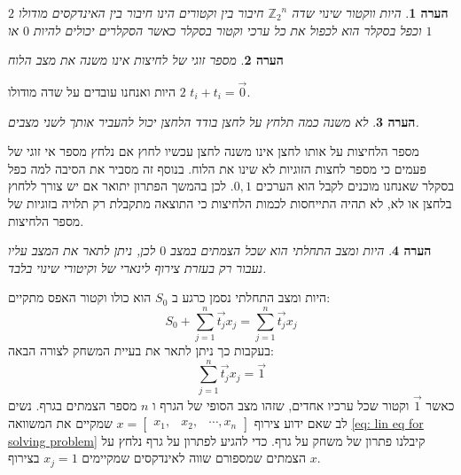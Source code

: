 \documentclass[12pt,leqno]{article}
\newtheorem{comm}{הערה}[section]
\newcommand{\sumi}[1]{\sum_{#1=1}^n}
\newcommand{\Zn}{{\mathbb{Z}_2}^n}
\begin{document}
\begin{comm}
    היות ווקטור שינוי שדה
    $\Zn$
    חיבור בין וקטורים הינו חיבור בין האינדקסים מודולו 
    $2$
    וכפל בסקלר
    הוא לכפול את כל ערכי וקטור בסקלר
    כאשר הסקלרים יכולים להיות
    $0$
    או 
    $1$
\end{comm}
\begin{comm}
    מספר זוגי של לחיצות אינו משנה את מצב הלוח
\end{comm}
היות 
ואנחנו עובדים על שדה מודולו 
$2$
$t_i + t_i = \vec{0}$.
\begin{comm}
    \label{comm: press is uneven presses}
    לא משנה כמה תלחץ על לחצן בודד הלחצן 
    יכול להעביר אותך לשני מצבים.
\end{comm}
מספר הלחיצות על אותו לחצן אינו משנה 
לחצן עכשיו 
לחוץ אם נלחץ מספר אי זוגי של פעמים 
כי מספר לחצות הזוגיות לא שינו את הלוח.
בנוסף זה מסביר את הסיבה למה כפל בסקלר שאנחנו מוכנים לקבל הוא הערכים 
$0,1$.
לכן בהמשך
הפתרון יתואר אם יש צורך ללחוץ בלחצן או לא,
לא תהיה התייחסות לכמות הלחיצות כי התוצאה מתקבלת רק תלויה בזוגיות של מספר הלחיצות.

\begin{comm}
    היות ומצב התחלתי הוא שכל הצמתים 
    במצב 
    $0$
    לכן,
    ניתן לתאר 
    את המצב עליו נעבור
    רק
    בעזרת צירוף לינארי של וקיטורי שינוי בלבד.
\end{comm}
היות ומצב התחלתי נסמן כרגע ב
$S_0$
הוא כולו וקטור האפס
מתקיים:
\begin{equation}
    \label{eq: sum change vectors}
    S_0 + \sumi{j} \vec{t_j} x_j=  \sumi{j}  \vec{t_j}x_j
\end{equation}
בעקבות כך ניתן לתאר את בעיית המשחק לצורה הבאה:
\begin{equation}
    \label{eq: lin eq for solving problem}
    \sumi{j} \vec{t_j} x_j = \vec{1}
\end{equation}
כאשר
$\vec{1}$
וקטור שכל ערכיו אחדים,
שזהו מצב הסופי של הגרף
ו
$n$
מספר הצמתים בגרף.
נשים לב 
שאם 
ידוע צירוף
$x = \begin{bmatrix}
    x_1, & x_2, & \cdots , x_n
\end{bmatrix}$
שמקיים את המשוואה 
\ref{eq: lin eq for solving problem}
קיבלנו פתרון של משחק על גרף.
כדי להגיע לפתרון על גרף נלחץ על הצמתים שמספורם 
שווה 
לאינדקסים 
שמקיימים
$x_j = 1$
בצירוף 
$x$.
\end{document}
